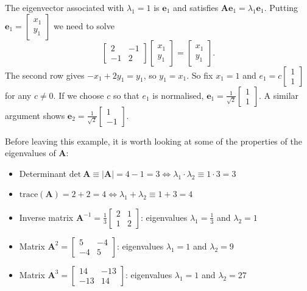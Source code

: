 The eigenvector associated with $\lambda_1 = 1$ is $\mathbf e_1$ and satisfies $\mathbf {Ae}_1 = \lambda _1 \mathbf e_1$.  Putting $\mathbf{e}_1=\left[\begin{array}{r} x_1 \\ y_1 \end{array}\right]$ we need to solve 
\[ \left[\begin{array}{rr}2 & -1\\-1 & 2\end{array}\right]\left[\begin{array}{r} x_1 \\ y_1 \end{array}\right] = \left[\begin{array}{r} x_1 \\ y_1 \end{array}\right]. \]
 The second row gives $-x_1 + 2y_1 = y_1$, so $y_1 = x_1$.  So fix $x_1 = 1$ and $e_1 = c\left[\begin{array}{r} 1 \\ 1 \end{array}\right]$ for any $c \neq 0$.  If we choose $c$ so that $e_1$ is normalised,  $ \mathbf{e}_1=\frac{1}{\sqrt{2}}\left[\begin{array}{r} 1 \\ 1 \end{array}\right]$.  
 A similar argument shows $\mathbf{e}_2=\frac{1}{\sqrt{2}}\left[\begin{array}{r} 1 \\ -1 \end{array}\right] $.


Before leaving this example, it is worth looking at some of the properties of the eigenvalues of $\mathbf A$:
\begin{itemize}
\item Determinant $\mathrm{det}\ \mathbf{A}\equiv|\mathbf{A}|=4-1 = 3 \Longleftrightarrow \lambda_1\cdot\lambda_2 \equiv 1\cdot 3 = 3$
\item $\mathrm{trace}(\mathbf{A}) = 2 + 2 = 4 \Longleftrightarrow \lambda_1 + \lambda_2 \equiv 1 + 3 = 4$
\item Inverse matrix $\mathbf{A}^{-1}=\frac{1}{3}\left[\begin{array}{rr}2 & 1\\1 & 2\end{array}\right]$: eigenvalues 
$\lambda_1=\frac{1}{3}$  and $\lambda_2=1$
\item Matrix $\mathbf{A}^2 =  \left[\begin{array}{rr}5 & -4\\-4 & 5\end{array}\right]$: eigenvalues 
$\lambda_1=1$  and $\lambda_2=9$
\item Matrix $\mathbf{A}^3 =  \left[\begin{array}{rr}14 & -13\\-13 & 14\end{array}\right]$: eigenvalues 
$\lambda_1=1$  and $\lambda_2=27$
\end{itemize} \sqend




